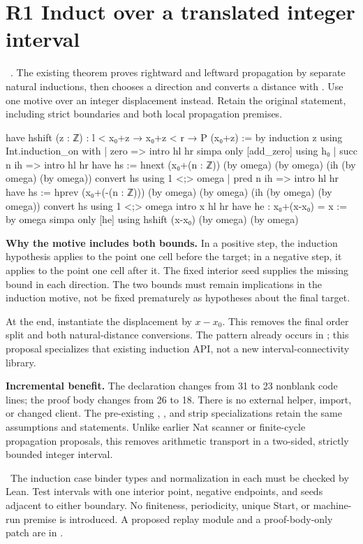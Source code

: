 \section{R1 Induct over a translated integer interval}

\ . The existing theorem proves rightward and leftward propagation by separate natural inductions, then chooses a direction and converts a distance with . Use one motive over an integer displacement instead. Retain the original statement, including strict boundaries and both local propagation premises.

\begin{Lean}
  have hshift (z : ℤ) : l < x₀+z → x₀+z < r → P (x₀+z) := by
    induction z using Int.induction_on with
    | zero =>
        intro hl hr
        simpa only [add_zero] using h₀
    | succ n ih =>
        intro hl hr
        have hs := hnext (x₀+(n : ℤ)) (by omega) (by omega)
          (ih (by omega) (by omega))
        convert hs using 1 <;> omega
    | pred n ih =>
        intro hl hr
        have hs := hprev (x₀+(-(n : ℤ))) (by omega) (by omega)
          (ih (by omega) (by omega))
        convert hs using 1 <;> omega
  intro x hl hr
  have he : x₀+(x-x₀) = x := by omega
  simpa only [he] using hshift (x-x₀) (by omega) (by omega)
\end{Lean}

\textbf{Why the motive includes both bounds.} In a positive step, the induction hypothesis applies to the point one cell before the target; in a negative step, it applies to the point one cell after it. The fixed interior seed supplies the missing bound in each direction. The two bounds must remain implications in the induction motive, not be fixed prematurely as hypotheses about the final target.

At the end, instantiate the displacement by \(x-x_0\). This removes the final order split and both natural-distance conversions. The  pattern already occurs in ; this proposal specializes that existing induction API, not a new interval-connectivity library.

\textbf{Incremental benefit.} The declaration changes from 31 to 23 nonblank code lines; the proof body changes from 26 to 18. There is no external helper, import, or changed client. The pre-existing , , and strip specializations retain the same assumptions and statements. Unlike earlier Nat scanner or finite-cycle propagation proposals, this removes arithmetic transport in a two-sided, strictly bounded integer interval.

\risk\ The induction case binder types and normalization in each  must be checked by Lean. Test intervals with one interior point, negative endpoints, and seeds adjacent to either boundary. No finiteness, periodicity, unique Start, or machine-run premise is introduced. A proposed replay module and a proof-body-only patch are in .
